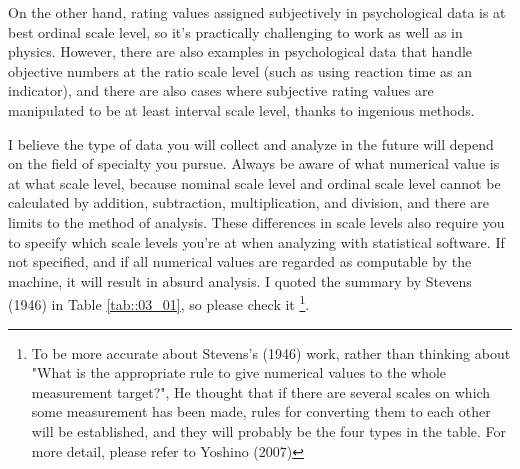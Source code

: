 \documentclass{ltjsbook}
\begin{document}
On the other hand, rating values assigned subjectively in psychological data is at best ordinal scale level, so it's practically challenging to work as well as in physics. However, there are also examples in psychological data that handle objective numbers at the ratio scale level (such as using reaction time as an indicator), and there are also cases where subjective rating values are manipulated to be at least interval scale level, thanks to ingenious methods.

I believe the type of data you will collect and analyze in the future will depend on the field of specialty you pursue. Always be aware of what numerical value is at what scale level, because nominal scale level and ordinal scale level cannot be calculated by addition, subtraction, multiplication, and division, and there are limits to the method of analysis. These differences in scale levels also require you to specify which scale levels you're at when analyzing with statistical software. If not specified, and if all numerical values are regarded as computable by the machine, it will result in absurd analysis. I quoted the summary by Stevens (1946) in Table \ref{tab::03_01}, so please check it \footnote{To be more accurate about Stevens's (1946) work, rather than thinking about "What is the appropriate rule to give numerical values to the whole measurement target?", He thought that if there are several scales on which some measurement has been made, rules for converting them to each other will be established, and they will probably be the four types in the table. For more detail, please refer to Yoshino (2007)}.


\end{document}
